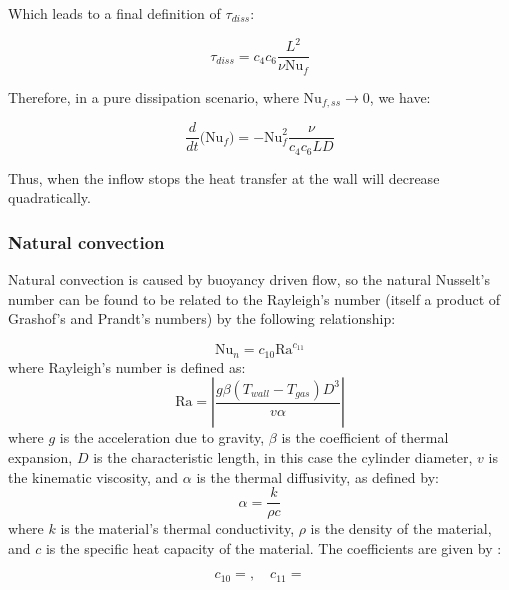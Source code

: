 \noindent Which leads to a final definition of $\tau_{diss}$:

\begin{equation}
\tau_{diss} = c_4 c_6 \frac{L^2}{\nu \text{Nu}_f}
\end{equation}

\noindent Therefore, in a pure dissipation scenario, where $\text{Nu}_{f,ss} \rightarrow 0$, we have:

\begin{equation}
\frac{d}{dt}\Big(\text{Nu}_f \Big) = -\text{Nu}_f^2 \frac{\nu}{c_4 c_6LD}
\end{equation}

\noindent Thus, when the inflow stops the heat transfer at the wall will decrease quadratically.

\subsubsection{Natural convection}
\label{sec:naturalConvection}

Natural convection is caused by buoyancy driven flow, so the natural Nusselt's number can be found to be related to the Rayleigh's number (itself a product of Grashof's and Prandt's numbers) by the following relationship:

\begin{equation}
\text{Nu}_n  = c_{10} \text{Ra}^{c_{11}}
\end{equation}
where Rayleigh's number is defined as:
\begin{equation}
\text{Ra} = \left| \frac{g\beta\left(T_{wall} - T_{gas} \right) D^3}{v\alpha}\right|
\end{equation}
where $g$ is the acceleration due to gravity, $\beta$ is the coefficient of thermal expansion, $D$ is the characteristic length, in this case the cylinder diameter, $v$ is the kinematic viscosity, and $\alpha$ is the thermal diffusivity, as defined by:
\begin{equation}
\label{equ:thermalDiffusivity}
\alpha = \frac{k}{\rho c}
\end{equation}
where $k$ is the material's thermal conductivity, $\rho$ is the density of the material, and $c$ is the specific heat capacity of the material. The coefficients are given by :

\begin{equation}
c_{10} =   ,  \quad c_{11} = 
\end{equation}



